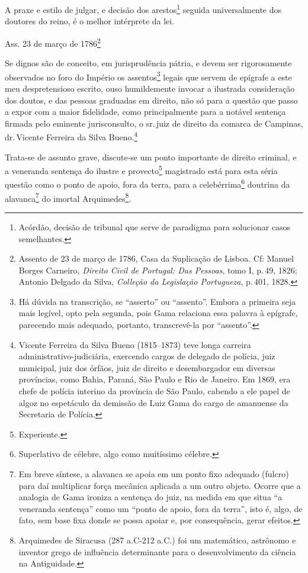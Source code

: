 A praxe e estilo de julgar, e decisão dos arestos\footnote{ Acórdão,
  decisão de tribunal que serve de paradigma para solucionar casos
  semelhantes.} seguida universalmente dos doutores do reino, é o melhor
intérprete da lei.

Ass. 23 de março de 1786\footnote{ Assento de 23 de março de 1786, Casa
  da Suplicação de Lisboa. Cf: Manuel Borges Carneiro, \emph{Direito
  Civil de Portugal: Das Pessoas}, tomo I, p.\,49, 1826; Antonio Delgado
  da Silva, \emph{Colleção da Legislação Portugueza}, p.\,401, 1828.}

Se dignos são de conceito, em jurisprudência pátria, e devem ser
rigorosamente observados no foro do Império os assentos\footnote{ Há
  dúvida na transcrição, se ``asserto'' ou ``assento''. Embora a primeira
  seja mais legível, opto pela segunda, pois Gama relaciona essa palavra
  à epígrafe, parecendo mais adequado, portanto, transcrevê-la por
  ``assento''.} legais que servem de epígrafe a este meu despretensioso
escrito, ouso humildemente invocar a ilustrada consideração dos doutos,
e das pessoas graduadas em direito, não só para a questão que passo a
expor com a maior fidelidade, como principalmente para a notável
sentença firmada pelo eminente jurisconsulto, o sr.\,juiz de direito da
comarca de Campinas, dr.\,Vicente Ferreira da Silva Bueno.\footnote{
  Vicente Ferreira da Silva Bueno (1815--1873) teve longa carreira
  administrativo-judiciária, exercendo cargos de delegado de polícia,
  juiz municipal, juiz dos órfãos, juiz de direito e desembargador em
  diversas províncias, como Bahia, Paraná, São Paulo e Rio de Janeiro.
  Em 1869, era chefe de polícia interino da província de São Paulo,
  cabendo a ele papel de algoz no espetáculo da demissão de Luiz Gama do
  cargo de amanuense da Secretaria de Polícia.}

Trata-se de assunto grave, discute-se um ponto importante de direito
criminal, e a veneranda sentença do ilustre e provecto\footnote{
  Experiente.} magistrado está para esta séria questão como o ponto de
apoio, fora da terra, para a celebérrima\footnote{ Superlativo de
  célebre, algo como muitíssimo célebre.} doutrina da
alavanca\footnote{ Em breve síntese, a alavanca se apoia em um ponto
  fixo adequado (fulcro) para daí multiplicar força mecânica aplicada a
  um outro objeto. Ocorre que a analogia de Gama ironiza a sentença do
  juiz, na medida em que situa ``a veneranda sentença'' como um ``ponto de
  apoio, fora da terra'', isto é, algo, de fato, sem base fixa donde se
  possa apoiar e, por consequência, gerar efeitos.} do imortal
Arquimedes\footnote{ Arquimedes de Siracusa (287 a.C-212 a.C.) foi um
  matemático, astrônomo e inventor grego de influência determinante para
  o desenvolvimento da ciência na Antiguidade.}.


